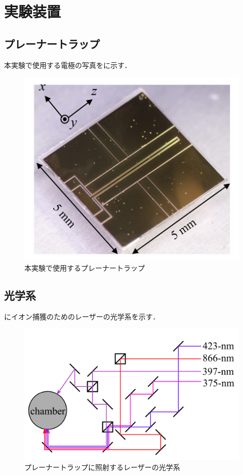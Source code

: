 \chapter{実験装置}
\section{プレーナートラップ}
本実験で使用する電極の写真をに示す．
\begin{figure}[h]
	\begin{center}
		\includegraphics[width = 0.6\linewidth]{./experimental_setup/figure/Using_PlannerTrap.png}
		\caption{本実験で使用するプレーナートラップ}
		\label{fig:Using_PlannerTrap}
	\end{center}
\end{figure}

\section{光学系}
にイオン捕獲のためのレーザーの光学系を示す．
\begin{figure}[h]
	\centering
		\includegraphics[width = 0.7\linewidth]{./experimental_setup/figure/Optical_System.png}
		\caption{プレーナートラップに照射するレーザーの光学系}
		\label{fig:optical_system}
\end{figure}

